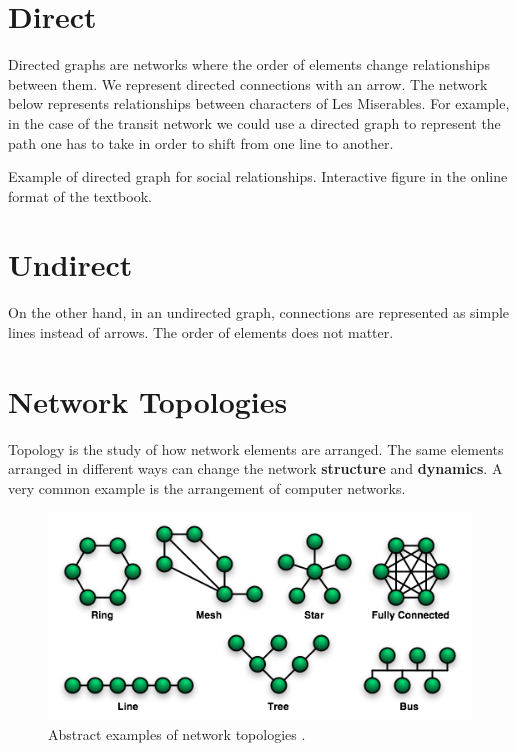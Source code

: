 \documentclass[
]{book}
\begin{document}
\section{Direct}\label{direct}

Directed graphs are networks where the order of elements change relationships between them. We represent directed connections with an arrow. The network below represents relationships between characters of Les Miserables. For example, in the case of the transit network we could use a directed graph to represent the path one has to take in order to shift from one line to another.

\label{fig:8-directed-graph}Example of directed graph for social relationships. Interactive figure in the online format of the textbook.

\section{Undirect}\label{undirect}

On the other hand, in an undirected graph, connections are represented as simple lines instead of arrows. The order of elements does not matter.

\section{Network Topologies}\label{network-topologies}

Topology is the study of how network elements are arranged. The same elements arranged in different ways can change the network \textbf{structure} and \textbf{dynamics}. A very common example is the arrangement of computer networks.



\begin{figure}
\includegraphics[width=0.75\linewidth]{images/08-network_topologies} \caption{Abstract examples of network topologies \citep{wikibooks_communication_2018}.}\label{fig:8-network-topologies}
\end{figure}
\end{document}
